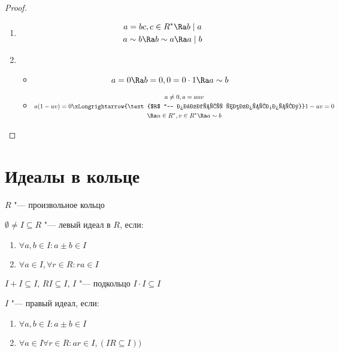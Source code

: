 \begin{proof}
	\begin{enumerate}
		\item \begin{gather*}
			a = bc, c \in R^* \Ra b \mid a \\
			a \sim b \Ra b \sim a \Ra a \mid b
		\end{gather*}
		\item \begin{itemize}
			\item \[ a = 0 \Ra b = 0, 0  = 0 \cdot 1 \Ra a \sim b \]
			\item \begin{gather*}
				a \ne 0, a = auv \\
				a(1 - uv) = 0 \xLongrightarrow{\text{$R$ "--- область целостности}} 1 - uv = 0 \\
				\Ra u \in R^*, v \in R^* \Ra a \sim b
			\end{gather*}
		\end{itemize}
	\end{enumerate}
\end{proof}

\section{Идеалы в кольце}
$R$ "--- произвольное кольцо

\begin{Def} 
	$\emptyset \ne I \subseteq R$ "--- левый идеал в $R$, если:
	\begin{enumerate}
		\item $ \forall a, b \in I \colon a \pm b \in I $
		\item $ \forall a \in I, \forall r \in R \colon ra \in I $
	\end{enumerate}
\end{Def}

\begin{Rem}
$I + I \subseteq I$, $RI \subseteq I$, $I$ "--- подкольцо $I \cdot I \subseteq I$
\end{Rem}

\begin{Def}
	$I$ "--- правый идеал, если:
	\begin{enumerate}
		\item $ \forall a, b \in I \colon a \pm b \in I $
		\item $ \forall a \in I \forall r \in R \colon ar \in I, (IR \subseteq I)) $
	\end{enumerate}
\end{Def}

